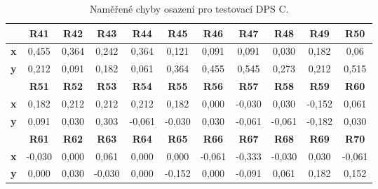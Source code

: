 \begin{table}[H]
  \caption{Naměřené chyby osazení pro testovací DPS C.}
  \begin{center}
  	\small
	  \begin{tabular}{|c|c|c|c|c|c|c|c|c|c|c|}
	    \hline
			& \textbf{R41}	& \textbf{R42}	& \textbf{R43}	& \textbf{R44}	& \textbf{R45}	& \textbf{R46}	& \textbf{R47}	& \textbf{R48}	& \textbf{R49}	& \textbf{R50}  \\
	    \hline
	    \textbf{x}	& 0,455&	0,364&	0,242&	0,364&	0,121&	0,091&	0,091&	0,030&	0,182&	0,06  \\
	    \hline
	    \textbf{y}	&0,212&	0,091&	0,182&	0,061&	0,364&	0,455&	0,545&	0,273&	0,212&	0,515 \\
	    \hline
			& \textbf{R51}	& \textbf{R52}	& \textbf{R53}	& \textbf{R54}	& \textbf{R55}	& \textbf{R56}	& \textbf{R57}	& \textbf{R58}	& \textbf{R59}	& \textbf{R60}  \\
	    \hline
	    \textbf{x}	&0,182&	0,212&	0,212&	0,212&	0,182&	0,000&	-0,030&	0,030&	-0,152&	0,061  \\
	    \hline
	    \textbf{y}	&0,091&	0,030&	0,303&	-0,061&	-0,030&	0,030&	-0,061&	-0,061&	-0,182&	0,030 \\
	    \hline
	    		& \textbf{R61}	& \textbf{R62}	& \textbf{R63}	& \textbf{R64}	& \textbf{R65}	& \textbf{R66}	& \textbf{R67}	& \textbf{R68}	& \textbf{R69}	& \textbf{R70}  \\
	    \hline
	    \textbf{x}	& -0,030&	0,000&	0,061&	0,000&	0,000&	-0,061&	-0,333&	-0,030&	0,030&	-0,061 \\
	    \hline
	    \textbf{y}	& 0,000&	0,030&	-0,030&	0,000&	-0,152&	0,000&	-0,091&	0,061&	0,182&	0,152 \\
	    \hline
	  \end{tabular}
  \end{center}
\end{table}





